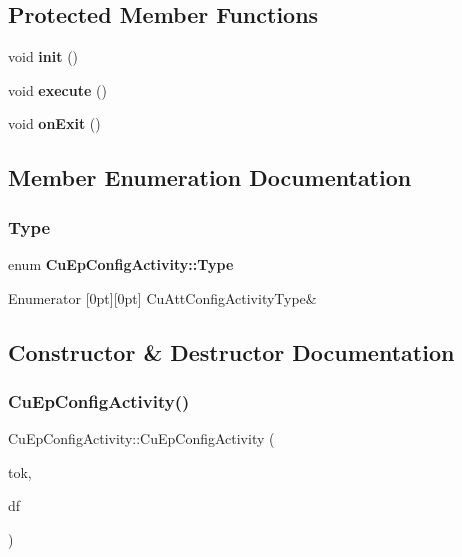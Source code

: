 \subsection*{Protected Member Functions}
\begin{DoxyCompactItemize}
\item 
void \textbf{ init} ()
\item 
void \textbf{ execute} ()
\item 
void \textbf{ on\+Exit} ()
\end{DoxyCompactItemize}


\subsection{Member Enumeration Documentation}
\mbox{\label{classCuEpConfigActivity_ad97b7e37d22827c7f502c536d0a7839b}} 
\subsubsection{Type}
{\footnotesize\ttfamily enum \textbf{ Cu\+Ep\+Config\+Activity\+::\+Type}}

\begin{DoxyEnumFields}{Enumerator}
[0pt][0pt]{}\mbox{\label{classCuEpConfigActivity_ad97b7e37d22827c7f502c536d0a7839ba43fc0fe99f1fcfe4bf31e8f05acfce04}} 
Cu\+Att\+Config\+Activity\+Type&\\
\hline

\end{DoxyEnumFields}


\subsection{Constructor \& Destructor Documentation}
\mbox{\label{classCuEpConfigActivity_a246067a4a8d5ea1a71e34c76fe149f6b}} 
\subsubsection{Cu\+Ep\+Config\+Activity()}
{\footnotesize\ttfamily Cu\+Ep\+Config\+Activity\+::\+Cu\+Ep\+Config\+Activity (\begin{DoxyParamCaption}\item[{const Cu\+Data \&}]{tok,  }\item[{\textbf{ Cu\+Ep\+C\+A\+Service} $\ast$}]{df }\end{DoxyParamCaption})}



